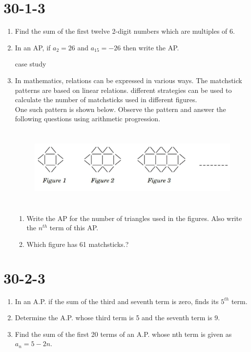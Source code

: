 \documentclass{article}
\begin{document}
\section{30-1-3}
\begin{enumerate}
   
    
    \item Find the sum of the first twelve 2-digit numbers which are multiples of 6.   
    
    \item In an AP, if $a_2 = 26$ and $a_{15} = -26$ then write the AP. 
 \begin{center}
  
    case study
\end{center}
\item In mathematics, relations can be expressed in various ways. The matchstick patterns are based on linear relations. different strategies can be used to calculate the number of matchsticks used in different figures.\\
 
  One such pattern is shown below. Observe the pattern and answer the following questions using arithmetic progression.
  
   \begin{figure}
\centering
\includegraphics[width= 12cm , height= 4cm]{assign.png}
\caption{}
\end{figure} 

\begin{enumerate}

\item Write the AP for the number of triangles used in the figures. Also
write the $n^{th}$ term of this AP.
\item Which figure has 61 matchsticks.? 
\end{enumerate}
\end{enumerate}


\section{30-2-3}
\begin{enumerate}
    \item In an A.P. if the sum of the third and seventh term is zero, finds its $5^{th}$
    term.
\item Determine the A.P. whose third term is 5 and the seventh term is 9.
\item Find the sum of the first 20 terms of an A.P. whose nth term is given as $a_n= 5 - 2n.$
\end{enumerate}
\end{document}
